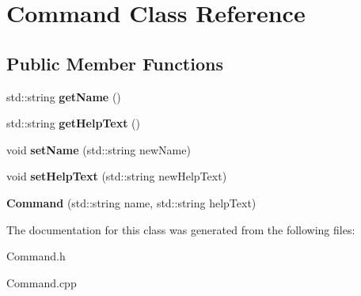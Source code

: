 \hypertarget{classCommand}{}\section{Command Class Reference}
\label{classCommand}
\subsection*{Public Member Functions}
\begin{DoxyCompactItemize}
\item 
\mbox{\label{classCommand_a0608c58857c617fa752425dac10cf0fe}} 
std\+::string {\bfseries get\+Name} ()
\item 
\mbox{\label{classCommand_a5ba7757ac9eb4c3bf3c6c2e60af567f4}} 
std\+::string {\bfseries get\+Help\+Text} ()
\item 
\mbox{\label{classCommand_ab142c37617f63372c23d2b77d1d94257}} 
void {\bfseries set\+Name} (std\+::string new\+Name)
\item 
\mbox{\label{classCommand_aa0de440f300e28930016b2628c80b9f7}} 
void {\bfseries set\+Help\+Text} (std\+::string new\+Help\+Text)
\item 
\mbox{\label{classCommand_ab92da5e599ebc2cca82139b1c8ddf3ab}} 
{\bfseries Command} (std\+::string name, std\+::string help\+Text)
\end{DoxyCompactItemize}


The documentation for this class was generated from the following files\+:\begin{DoxyCompactItemize}
\item 
Command.\+h\item 
Command.\+cpp\end{DoxyCompactItemize}
